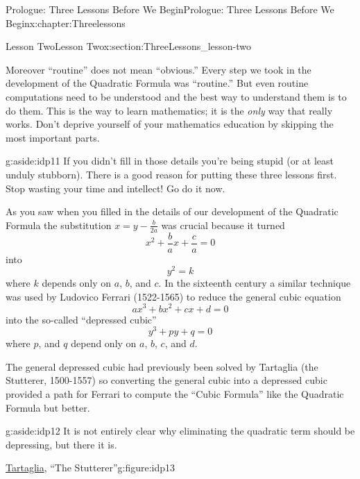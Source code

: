 \documentclass[oneside,10pt,]{book}
\numberwithin{equation}{section}
\begin{document}
\begin{chapterptx}{Prologue: Three Lessons Before We Begin}{}{Prologue: Three Lessons Before We Begin}{}{}{x:chapter:Threelessons}
\begin{sectionptx}{Lesson Two}{}{Lesson Two}{}{}{x:section:ThreeLessons_lesson-two}
\par
Moreover ``routine'' does not mean ``obvious.'' Every step we took in the development of the Quadratic Formula was ``routine.'' But even routine computations need to be understood and the best way to understand them is to do them. This is the way to learn mathematics; it is the \emph{only} way that really works. Don't deprive yourself of your mathematics education by skipping the most important parts.%
\begin{aside}{}{g:aside:idp11}%
If you didn't fill in those details you're being stupid (or at least unduly stubborn). There is a good reason for putting these three lessons first. Stop wasting your time and intellect! Go do it now.%
\end{aside}
As you saw when you filled in the details of our development of the Quadratic Formula the substitution \(x=y-\frac{b}{2a}\) was crucial because it turned%
\begin{equation*}
x^2+\frac{b}{a}x +\frac{c}{a}=0
\end{equation*}
into%
\begin{equation*}
y^2=k
\end{equation*}
where \(k\) depends only on \(a\), \(b\), and \(c\). In the sixteenth century a similar technique was used by Ludovico Ferrari (1522-1565) to reduce the general cubic equation%
\begin{equation}
ax^3+bx^2+cx+d=0\label{x:men:eq_GenCubic}
\end{equation}
into the so-called ``depressed cubic''%
\begin{equation*}
y^3 +py+q=0
\end{equation*}
where \(p\), and \(q\) depend only on \(a\), \(b\), \(c\), and \(d\).%
\par
The general depressed cubic had previously been solved by Tartaglia (the Stutterer, 1500-1557) so converting the general cubic into a depressed cubic provided a path for Ferrari to compute the ``Cubic Formula'' \textemdash{} like the Quadratic Formula but better.%
\begin{aside}{}{g:aside:idp12}%
It is not entirely clear why eliminating the quadratic term should be depressing, but there it is.%
\end{aside}
\begin{figureptx}{\href{https://mathshistory.st-andrews.ac.uk/Biographies/Tartaglia/}{Tartaglia}\protect\footnotemark{}, ``The Stutterer''}{g:figure:idp13}{}%
\begin{image}{0.36}{0.28}{0.36}%

\end{image}
\end{figureptx}
\end{sectionptx}
\end{chapterptx}
\end{document}
